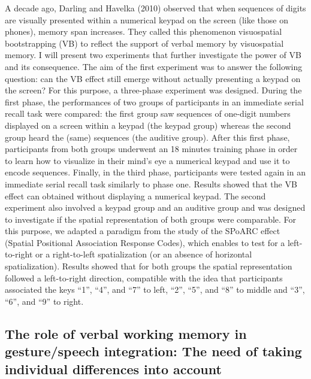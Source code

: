 \documentclass[12pt,]{book}
\begin{document}
A decade ago, Darling and Havelka (2010) observed that when sequences of digits are visually presented within a numerical keypad on the screen (like those on phones), memory span increases. They called this phenomenon visuospatial bootstrapping (VB) to reflect the support of verbal memory by visuospatial memory. I will present two experiments that further investigate the power of VB and its consequence. The aim of the first experiment was to answer the following question: can the VB effect still emerge without actually presenting a keypad on the screen? For this purpose, a three-phase experiment was designed. During the first phase, the performances of two groups of participants in an immediate serial recall task were compared: the first group saw sequences of one-digit numbers displayed on a screen within a keypad (the keypad group) whereas the second group heard the (same) sequences (the auditive group). After this first phase, participants from both groups underwent an 18 minutes training phase in order to learn how to visualize in their mind's eye a numerical keypad and use it to encode sequences. Finally, in the third phase, participants were tested again in an immediate serial recall task similarly to phase one. Results showed that the VB effect can obtained without displaying a numerical keypad. The second experiment also involved a keypad group and an auditive group and was designed to investigate if the spatial representation of both groups were comparable. For this purpose, we adapted a paradigm from the study of the SPoARC effect (Spatial Positional Association Response Codes), which enables to test for a left-to-right or a right-to-left spatialization (or an absence of horizontal spatialization). Results showed that for both groups the spatial representation followed a left-to-right direction, compatible with the idea that participants associated the keys ``1'', ``4'', and ``7'' to left, ``2'', ``5'', and ``8'' to middle and ``3'', ``6'', and ``9'' to right.

\hypertarget{the-role-of-verbal-working-memory-in-gesturespeech-integration-the-need-of-taking-individual-differences-into-account}{%
\subsection{The role of verbal working memory in gesture/speech integration: The need of taking individual differences into account}\label{the-role-of-verbal-working-memory-in-gesturespeech-integration-the-need-of-taking-individual-differences-into-account}}
\end{document}
